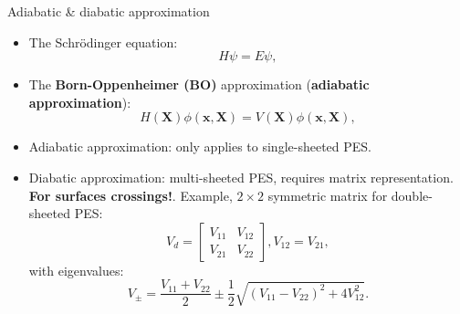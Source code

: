 \documentclass{beamer}
\newcommand\Fontvi{\fontsize{8}{7.2}\selectfont} %
\begin{document}
%

\begin{frame}{Adiabatic \& diabatic approximation}
    \Fontvi
    \begin{itemize}
        \item The Schrödinger equation:
        \begin{equation}
            H \psi = E \psi,
            \label{eq:schro}
        \end{equation}
        \item The \textbf{Born-Oppenheimer (BO)} approximation (\textbf{adiabatic approximation}):
        \begin{equation}
            H(\mathbf{X})\phi(\mathbf{x}, \mathbf{X}) = V(\mathbf{X})\phi(\mathbf{x}, \mathbf{X}),
            \label{eq:bo}
        \end{equation}
        \item Adiabatic approximation: only applies to single-sheeted PES.
        \item Diabatic approximation: multi-sheeted PES, requires matrix representation. \textbf{For surfaces crossings!}. Example, $2 \times 2$ symmetric matrix for double-sheeted PES:
        \begin{equation}
            V_d = 
            \begin{bmatrix}
                V_{11} & V_{12} \\
                V_{21} & V_{22}
            \end{bmatrix}
            , V_{12} = V_{21},
        \label{2x2diabaticmatrix}
        \end{equation}
        with eigenvalues:
        \begin{equation}
            V_{\pm} = \frac{V_{11} + V_{22}}{2} \pm \frac{1}{2}\sqrt{(V_{11} - V_{22})^2 + 4V_{12}^2}.
            \label{2x2ev}
        \end{equation}
    \end{itemize}
\end{frame}
\end{document}
